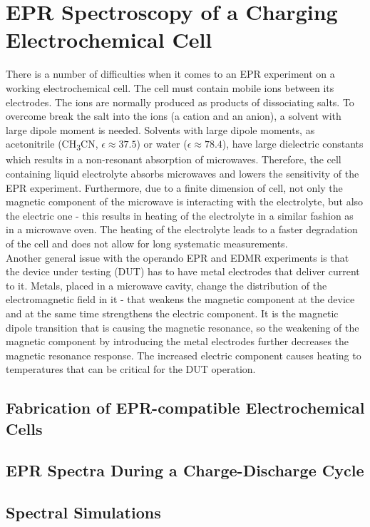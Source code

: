 \section{EPR Spectroscopy of a Charging Electrochemical Cell}
There is a number of difficulties when it comes to an EPR experiment on a working electrochemical cell. The cell must contain mobile ions between its electrodes. The ions are normally produced as products of dissociating salts. To overcome break the salt into the ions (a cation and an anion), a solvent with large dipole moment is needed. Solvents with large dipole moments, as acetonitrile (CH\textsubscript{3}CN, $\epsilon\approx 37.5$) or water ($\epsilon\approx78.4$), have large dielectric constants which results in a non-resonant absorption of microwaves. Therefore, the cell containing liquid electrolyte absorbs microwaves and lowers the sensitivity of the EPR experiment. Furthermore, due to a finite dimension of cell, not only the magnetic component of the microwave is interacting with the electrolyte, but also the electric one - this results in heating of the electrolyte in a similar fashion as in a microwave oven. The heating of the electrolyte leads to a faster degradation of the cell and does not allow for long systematic measurements.\\
Another general issue with the operando EPR and EDMR experiments is that the device under testing (DUT) has to have metal electrodes that deliver current to it. Metals, placed in a microwave cavity, change the distribution of the electromagnetic field in it - that weakens the magnetic component at the device and at the same time strengthens the electric component. It is the magnetic dipole transition that is causing the magnetic resonance, so the weakening of the magnetic component by introducing the metal electrodes further decreases the magnetic resonance response. The increased electric component causes heating to temperatures that can be critical for the DUT operation.

\subsection{Fabrication of EPR-compatible Electrochemical Cells}

\subsection{EPR Spectra During a Charge-Discharge Cycle}

\subsection{Spectral Simulations}

